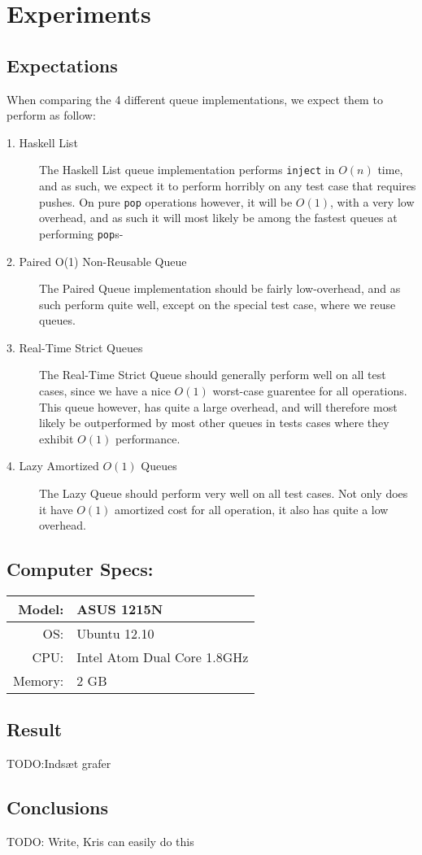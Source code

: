 
\section{Experiments}
\subsection{Expectations}
When comparing the 4 different queue implementations, we expect them to perform as follow:
\begin{description}

\item[1. Haskell List]
The Haskell List queue implementation performs \texttt{inject} in $O(n)$ time, and as such, we expect it to perform horribly on any test case that requires pushes.
On pure \texttt{pop} operations however, it will be $O(1)$, with a very low overhead, and as such it will most likely be among the fastest queues at performing \texttt{pop}s-
\item[2. Paired O(1) Non-Reusable Queue]
The Paired Queue implementation should be fairly low-overhead, and as such perform quite well, except on the special test case, where we reuse queues.
\item[3. Real-Time Strict Queues] 
The Real-Time Strict Queue should generally perform well on all test cases, since we have a nice $O(1)$ worst-case guarentee for all operations. This queue however, has quite a large overhead, and will therefore most likely be outperformed by most other queues in tests cases where they exhibit $O(1)$ performance. 
\item[4. Lazy Amortized $O(1)$ Queues]
The Lazy Queue should perform very well on all test cases. Not only does it have $O(1)$ amortized cost for all operation, it also has quite a low overhead. 

\end{description}

\subsection{Computer Specs:}
\begin{tabular}{| r  l |} \hline
Model: &  ASUS 1215N \\ \hline
OS: & Ubuntu 12.10 \\ \hline
CPU: & Intel Atom Dual Core 1.8GHz\\ \hline
Memory: & 2 GB\\ \hline
\end{tabular}

\subsection{Result}
TODO:Indsæt grafer 

\subsection{Conclusions}
 
 TODO: Write, Kris can easily do this